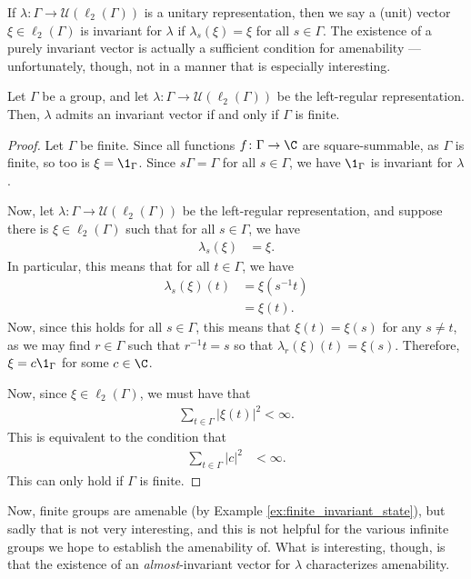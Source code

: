 If $\lambda\colon \Gamma\rightarrow \mathcal{U}\left( \ell_2\left( \Gamma \right) \right)$ is a unitary representation, then we say a (unit) vector $\xi\in \ell_2\left( \Gamma \right)$ is invariant for $\lambda$ if $\lambda_s\left( \xi \right) = \xi$ for all $s\in\Gamma$. The existence of a purely invariant vector is actually a sufficient condition for amenability --- unfortunately, though, not in a manner that is especially interesting.
\begin{theorem}
  Let $\Gamma$ be a group, and let $\lambda\colon \Gamma\rightarrow \mathcal{U}\left( \ell_2\left( \Gamma \right) \right)$ be the left-regular representation. Then, $\lambda$ admits an invariant vector if and only if $\Gamma$ is finite.
\end{theorem}
\begin{proof}
  Let $\Gamma$ be finite. Since all functions $f\colon \Gamma\rightarrow \C$ are square-summable, as $\Gamma$ is finite, so too is $\xi = \1_{\Gamma}$. Since $s\Gamma = \Gamma$ for all $s\in\Gamma$, we have $\1_{\Gamma}$ is invariant for $\lambda$.\newline

  Now, let $\lambda\colon \Gamma\rightarrow \mathcal{U}\left( \ell_2\left( \Gamma \right) \right)$ be the left-regular representation, and suppose there is $\xi\in \ell_2\left( \Gamma \right)$ such that for all $s\in\Gamma$, we have
  \begin{align*}
    \lambda_s\left( \xi \right) &= \xi.
  \end{align*}
  In particular, this means that for all $t\in\Gamma$, we have
  \begin{align*}
    \lambda_s\left( \xi \right)\left( t \right) &= \xi\left( s^{-1}t \right)\\
                                                &= \xi\left( t \right).
  \end{align*}
  Now, since this holds for all $s\in\Gamma$, this means that $\xi\left( t \right) = \xi\left( s \right)$ for any $s\neq t$, as we may find $r\in \Gamma$ such that $r^{-1}t = s$ so that $\lambda_r\left( \xi \right)\left( t \right) = \xi\left( s \right)$. Therefore, $\xi = c\1_{\Gamma}$ for some $c\in\C$.\newline

  Now, since $\xi\in \ell_2\left( \Gamma \right)$, we must have that
  \begin{align*}
    \sum_{t\in\Gamma}\left\vert \xi(t) \right\vert^2 < \infty.
  \end{align*}
  This is equivalent to the condition that
  \begin{align*}
    \sum_{t\in\Gamma}\left\vert c \right\vert^2 &< \infty.
  \end{align*}
  This can only hold if $\Gamma$ is finite.
\end{proof}
Now, finite groups are amenable (by Example \ref{ex:finite_invariant_state}), but sadly that is not very interesting, and this is not helpful for the various infinite groups we hope to establish the amenability of. What is interesting, though, is that the existence of an \textit{almost}-invariant vector for $\lambda$ characterizes amenability.\newline

